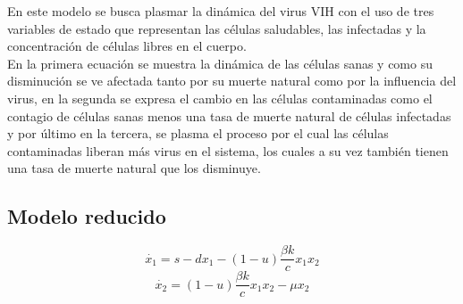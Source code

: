 \documentclass{article}
\begin{document}
\vspace{0.5cm}

En este modelo se busca plasmar la dinámica del virus VIH con el uso de tres
variables de estado que representan las células saludables, las infectadas y la
concentración de células libres en el cuerpo.\\

En la primera ecuación se muestra la dinámica de las células sanas y como su
disminución se ve afectada tanto por su muerte natural como por la influencia
del virus, en la segunda se expresa el cambio en las células
contaminadas como el contagio de células sanas menos una tasa de muerte natural
de células infectadas y por último en la tercera, se plasma el proceso
por el cual las células contaminadas liberan más virus en el sistema, los
cuales a su vez también tienen una tasa de muerte natural que los disminuye.\\

\newpage

    \subsection{Modelo reducido}

    \Large
    $$\dot{x_1} = s -dx_1 - (1-u) \frac{\beta k}{c} x_1 x_2$$
    $$\dot{x_2} = (1-u) \frac{\beta k}{c} x_1 x_2 - \mu x_2$$
    \normalsize

    \vspace{0.5cm}
\end{document}
